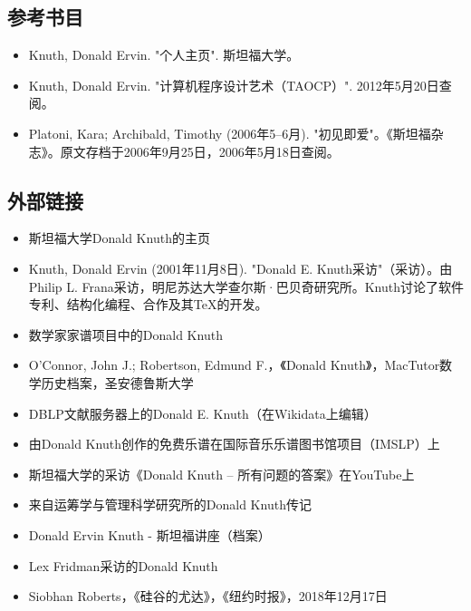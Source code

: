 \subsection{参考书目} 
\begin{itemize}
\item Knuth, Donald Ervin. "个人主页". 斯坦福大学。  
\item Knuth, Donald Ervin. "计算机程序设计艺术（TAOCP）". 2012年5月20日查阅。  
\item Platoni, Kara; Archibald, Timothy (2006年5–6月). "初见即爱"。《斯坦福杂志》。原文存档于2006年9月25日，2006年5月18日查阅。
\end{itemize}
\subsection{外部链接} 
\begin{itemize}
\item 斯坦福大学Donald Knuth的主页  
\item Knuth, Donald Ervin (2001年11月8日). "Donald E. Knuth采访"（采访）。由Philip L. Frana采访，明尼苏达大学查尔斯·巴贝奇研究所。Knuth讨论了软件专利、结构化编程、合作及其TeX的开发。  
\item 数学家家谱项目中的Donald Knuth  
\item O'Connor, John J.; Robertson, Edmund F.，《Donald Knuth》，MacTutor数学历史档案，圣安德鲁斯大学  
\item DBLP文献服务器上的Donald E. Knuth（在Wikidata上编辑）  
\item 由Donald Knuth创作的免费乐谱在国际音乐乐谱图书馆项目（IMSLP）上  
\item 斯坦福大学的采访《Donald Knuth – 所有问题的答案》在YouTube上  
\item 来自运筹学与管理科学研究所的Donald Knuth传记  
\item Donald Ervin Knuth - 斯坦福讲座（档案）  
\item Lex Fridman采访的Donald Knuth  
\item Siobhan Roberts，《硅谷的尤达》，《纽约时报》，2018年12月17日
\end{itemize}